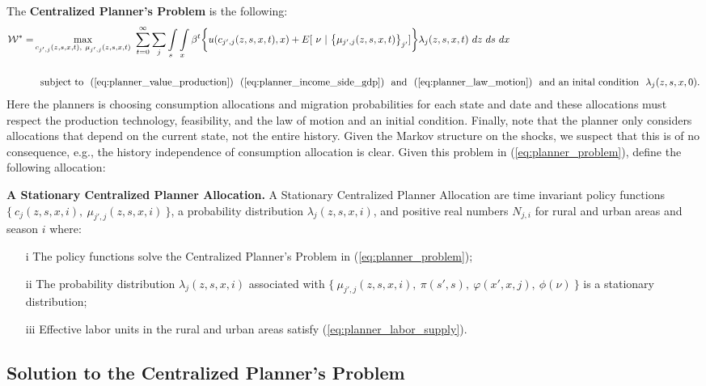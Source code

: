 \documentclass[12pt,pdftex]{article}
\begin{document}
\begin{onehalfspacing}
The \textbf{Centralized Planner's Problem} is the following:
{\small
\begin{align}
\mathcal{W}^{*} = & \max\limits_{c_{j',j}(z, s, x, t),\ \mu_{j',j}(z, s, x, t)} \ \sum_{t=0}^{\infty}\sum_{j} \int\limits_{s} \int\limits_{x} \beta^{t} \bigg \{ u(c_{j',j}(z, s, x, t), x) + E[ \ \nu \ | \ \big\{\mu_{j',j}(z,s,x,t)\big\}_{j'}]  \bigg \} \lambda_{j}(z, s, x, t) \ dz \ ds \ dx \ \ \nonumber \\
\nonumber \\
& \ \ \mbox{subject to} \ \ (\ref{eq:planner_value_production}) \ \ (\ref{eq:planner_income_side_gdp}) \ \ \mbox{and} \ \ (\ref{eq:planner_law_motion}) \ \ \mbox{and an inital condition} \ \ \lambda_j(z, s, x,0).
\label{eq:planner_problem}
\end{align}}Here the planners is choosing consumption allocations and migration probabilities for each state and date and these allocations must respect the production technology, feasibility, and the law of motion and an initial condition. Finally, note that the planner only considers allocations that depend on the current state, not the entire history. Given the Markov structure on the shocks, we suspect that this is of no consequence, e.g., the history independence of consumption allocation is clear. Given this problem in (\ref{eq:planner_problem}), define the following allocation:

\textbf{A Stationary Centralized Planner Allocation.}  A Stationary Centralized Planner Allocation are time invariant policy functions $\{\ c_{j}(z, s, x, i),\ \mu_{j',j}(z, s, x, i) \ \}$, a probability distribution $\lambda_{j}(z, s, x, i)$, and positive real numbers $N_{j,i}$ for rural and urban areas and season $i$ where:
\begin{itemize}
\item[i] The policy functions solve the Centralized Planner's Problem in (\ref{eq:planner_problem});
\item[ii] The probability distribution $\lambda_{j}(z, s, x, i)$ associated with $\{\ \mu_{j',j}(z, s, x, i), \ \pi(s',s), \ \varphi(x',x, j), \ \phi(\nu) \ \}$ is a stationary distribution;
\item[iii] Effective labor units in the rural and urban areas satisfy (\ref{eq:planner_labor_supply}).
\end{itemize}

\subsection{Solution to the Centralized Planner's Problem}


\end{onehalfspacing}
\end{document}
